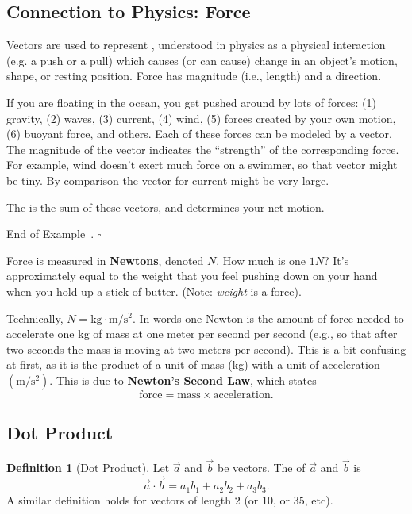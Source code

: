 \documentclass[10pt]{article}
\theoremstyle{definition}
\newtheorem{definition}[theorem]{Definition}
\newtheorem{example}[theorem]{Example}
\renewenvironment{example}
{\begin{oldexample}}
  {\par\smallskip\hfill   End of Example~\theexample. $\square$    \par\end{oldexample}}
\newcommand{\1}[1]{\textbf{1}_{\left[#1\right]}} %
\newcommand{\dempfcolor}[1]{{\color{RoyalBlue}#1}}
\newcommand{\demph}[1]{\dempfcolor{{\sl #1}}}
\begin{document}
\subsection{Connection to Physics: Force}
Vectors are used to represent \demph{force}, understood in physics as a physical interaction (e.g. a
push or a pull) which causes (or can cause) change in an object's motion, shape, or resting position.
Force has magnitude (i.e., length) and a direction.
% 
\begin{example}[Forces]
  If you are floating in the ocean, you get pushed around by lots of forces: (1) gravity, (2) waves, (3)
  current, (4) wind, (5) forces created by your own motion, (6) buoyant force, and others. Each of these
  forces can be modeled by a vector. The magnitude of the vector indicates the ``strength'' of the
  corresponding force. For example, wind doesn't exert much force on a swimmer, so that vector might be
  tiny. By comparison the vector for current might be very large.

  The \demph{resultant force} is the sum of these vectors, and determines your net motion.
\end{example}

Force is measured in \textbf{Newtons}, denoted $N$. How much is one $1N$? It's approximately equal to the
weight that you feel pushing down on your hand when you hold up a stick of butter. (Note: \textit{weight}
is a force).

Technically, $N=\mathrm{kg}\cdot \mathrm{m/s^{2}}$. In words one Newton is the amount of force needed to
accelerate one \textrm{kg} of mass at one meter per second per second (e.g., so that after two seconds
the mass is moving at two meters per second). This is a bit confusing at first, as it is the product of a
unit of mass (\textrm{kg}) with a unit of acceleration $(\mathrm{m/s^{2}})$. This is due to
\textbf{Newton's Second Law}, which states
\begin{equation*}
  \text{force} = \text{mass}\times \text{acceleration}.
\end{equation*}




\subsection{Dot Product}

\begin{definition}[Dot Product]
  Let $\vec{a}$ and $\vec{b}$ be vectors. The \demph{dot product} of $\vec{a}$ and $\vec{b}$ is
  \begin{equation*}
    \vec{a}\cdot \vec{b} = a_{1}b_{1}+ a_{2}b_{2}+ a_{3}b_{3}.
  \end{equation*}
  A similar definition holds for vectors of length $2$ (or $10$, or $35$, etc).
\end{definition}
\end{document}
